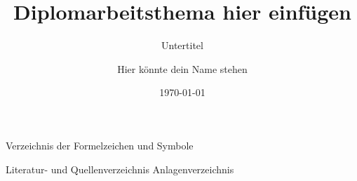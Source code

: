 %
%
\makeatletter
{}
\makeatother
%
%
%
\titlehead{\centering\texttt{[image: htw-logo]} } %
\subject{Diplomarbeit}
\title{Diplomarbeitsthema hier einfügen}
\subtitle{Untertitel }
\author{Hier könnte dein Name stehen}
\date{\today } %
\publishers{Verlag }

\afterpage{\blankpage}
\maketitle
\newpage
\tableofcontents
\newpage
\printnoidxglossaries
\newpage
Verzeichnis der Formelzeichen und Symbole
\newpage
\listoffigures
\newpage
\listoftables
\newpage
\cleardoubleoddpage
%
%
%
%
%
%
%
%
%
%
%
%
Literatur- und Quellenverzeichnis
\newpage
%
%
%
%
% 
Anlagenverzeichnis
\newpage
\appendix
\newpage
\afterpage{\blankpage}
\newpage

